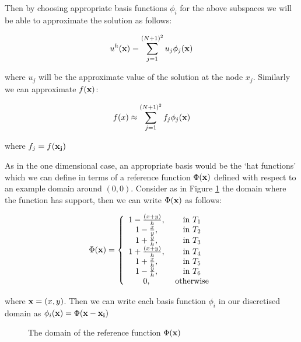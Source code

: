 Then by choosing appropriate basis functions $\phi_i$ for the above subspaces
we will be able to approximate the solution as follows:

\begin{equation}
    u^h(\mathbf{x}) = \sum_{j=1}^{(N+1)^2}u_j\phi_j(\mathbf{x})
\end{equation}

where $u_j$ will be the approximate value of the solution at the node $x_j$.
Similarly we can approximate $f(\mathbf{x})$:

\begin{equation}
    f(x) \approx \sum_{j=1}^{(N+1)^2}f_j\phi_j(\mathbf{x})
\end{equation}

where $f_j = f(\mathbf{x_j})$


As in the one dimensional case, an appropriate basis would be the `hat
functions' which we can define in terms of a reference function $\Phi(\mathbf{x})$
defined with respect to an example domain around $(0,0)$.  Consider as in
Figure \ref{fig:reference-function-domain} the domain where the function has
support, then we can write $\Phi(\mathbf{x})$ as follows:

\begin{equation}\label{eq:two-d-ref-basis-fn}
    \Phi(\mathbf{x}) = \left\{\begin{array}{c c}
                    1 - \frac{(x + y)}{h}, & \text{ in } T_1 \\
                    1 - \frac{x}{y},       & \text{ in } T_2 \\
                    1 + \frac{y}{h},       & \text{ in } T_3 \\
                    1 + \frac{(x + y)}{h}, & \text{ in } T_4 \\
                    1 + \frac{x}{h},       & \text{ in } T_5 \\
                    1 - \frac{y}{h},       & \text{ in } T_6 \\
                    0,                     & \text{ otherwise}
                  \end{array}\right.
\end{equation}

where $\mathbf{x} = (x, y)$. Then we can write each basis function $\phi_i$ in our
discretised domain as $\phi_i(\mathbf{x}) = \Phi(\mathbf{x} - \mathbf{x_i})$

\begin{figure}
\centering

\caption{The domain of the reference function $\Phi(\mathbf{x})$}
\label{fig:reference-function-domain}
\end{figure}

